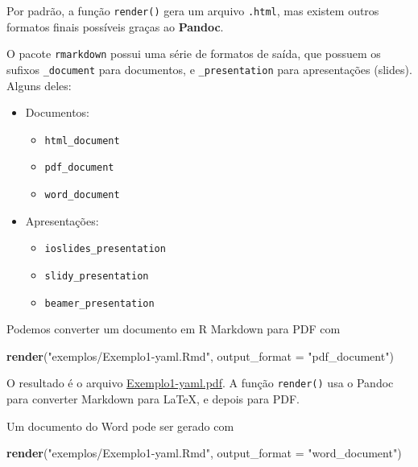 \documentclass[10pt,a4paper]{book}
\newenvironment{Shaded}{\begin{snugshade}}{\end{snugshade}}
\newcommand{\KeywordTok}[1]{\textcolor[rgb]{0.13,0.29,0.53}{\textbf{#1}}}
\newcommand{\DataTypeTok}[1]{\textcolor[rgb]{0.13,0.29,0.53}{#1}}
\newcommand{\StringTok}[1]{\textcolor[rgb]{0.31,0.60,0.02}{#1}}
\newcommand{\NormalTok}[1]{#1}
\providecommand{\tightlist}{%
  \setlength{\itemsep}{0pt}\setlength{\parskip}{0pt}}
\begin{document}
Por padrão, a função \texttt{render()} gera um arquivo \texttt{.html},
mas existem outros formatos finais possíveis graças ao \textbf{Pandoc}.

O pacote \texttt{rmarkdown} possui uma série de formatos de saída, que
possuem os sufixos \texttt{\_document} para documentos, e
\texttt{\_presentation} para apresentações (slides). Alguns deles:

\begin{itemize}
\tightlist
\item
  Documentos:

  \begin{itemize}
  \tightlist
  \item
    \texttt{html\_document}
  \item
    \texttt{pdf\_document}
  \item
    \texttt{word\_document}
  \end{itemize}
\item
  Apresentações:

  \begin{itemize}
  \tightlist
  \item
    \texttt{ioslides\_presentation}
  \item
    \texttt{slidy\_presentation}
  \item
    \texttt{beamer\_presentation}
  \end{itemize}
\end{itemize}

Podemos converter um documento em R Markdown para PDF com

\begin{Shaded}
\begin{Highlighting}[]
\KeywordTok{render}\NormalTok{(}\StringTok{"exemplos/Exemplo1-yaml.Rmd"}\NormalTok{, }\DataTypeTok{output_format =} \StringTok{"pdf_document"}\NormalTok{)}
\end{Highlighting}
\end{Shaded}

O resultado é o arquivo
\href{exemplos/Exemplo1-yaml.pdf}{Exemplo1-yaml.pdf}. A função
\texttt{render()} usa o Pandoc para converter Markdown para LaTeX, e
depois para PDF.

Um documento do Word pode ser gerado com

\begin{Shaded}
\begin{Highlighting}[]
\KeywordTok{render}\NormalTok{(}\StringTok{"exemplos/Exemplo1-yaml.Rmd"}\NormalTok{, }\DataTypeTok{output_format =} \StringTok{"word_document"}\NormalTok{)}
\end{Highlighting}
\end{Shaded}
\end{document}
